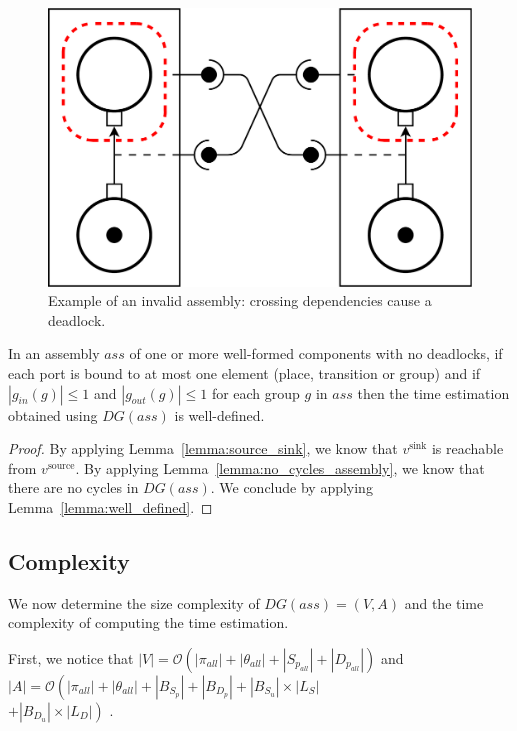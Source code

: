 \begin{figure}[h]
  \begin{center}
    \includegraphics[width=0.7\linewidth]{./images/deadlock.pdf}
  \end{center}
  \caption{Example of an invalid assembly: crossing dependencies cause a deadlock.}
  \label{fig:deadlock}
\end{figure}

\begin{theorem}
 In an assembly $ass$ of one or more well-formed components with no deadlocks,
 if each port is bound to at most one element (place, transition or group) and if
 $\left|g_{in}(g)\right|\leq 1$ and $\left|g_{out}(g)\right|\leq 1$ for each group
 $g$ in $ass$ then the time estimation obtained using $DG(ass)$ is well-defined.
 \label{theorem:well_defined}
\end{theorem}

\begin{proof}
 By applying Lemma~\ref{lemma:source_sink}, we know that $v^\text{sink}$ is reachable
 from $v^\text{source}$. By applying Lemma~\ref{lemma:no_cycles_assembly}, we know
 that there are no cycles in $DG(ass)$. We conclude by applying
 Lemma~\ref{lemma:well_defined}.
\end{proof}


\subsection{Complexity}

We now determine the size complexity of $DG(ass)=(V,A)$ and the time
complexity of computing the time estimation.

First, we notice that
$|V| = \mathcal{O}\left(\left|\pi_{all}\right|+\left|\theta_{all}\right|+\left|S_{p_{all}}\right|+\left|D_{p_{all}}\right|\right)$
and
$|A| = \mathcal{O}\left(\left|\pi_{all}\right|+\left|\theta_{all}\right|+\left|B_{S_p}\right|+\left|B_{D_p}\right|+\left|B_{S_u}\right|\times\left|L_S\right|\right.$ \\
$\left.+\left|B_{D_u}\right|\times\left|L_D\right|\right)$
.

